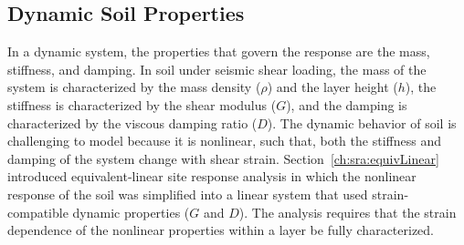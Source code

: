 \documentclass[12pt,oneside]{book}
\begin{document}
% 

\subsection{Dynamic Soil Properties}\label{ch:sra:dynprops}
In a dynamic system,  the properties that govern the response are the mass, stiffness, and damping.
In soil under seismic shear loading, the mass of the system is characterized by the mass density
($\rho$) and the layer height ($h$), the stiffness is characterized by the shear modulus ($G$), and
the damping is characterized by the viscous damping ratio ($D$).  The dynamic behavior of soil is
challenging to model because it is nonlinear, such that, both the stiffness and damping of the
system change with shear strain.  Section~\ref{ch:sra:equivLinear} introduced
equivalent-linear site response analysis in which the nonlinear response of the soil was simplified
into a linear system that used strain-compatible dynamic properties ($G$ and $D$).  The analysis
requires that the strain dependence of the nonlinear properties within a layer be fully
characterized.
\end{document}
